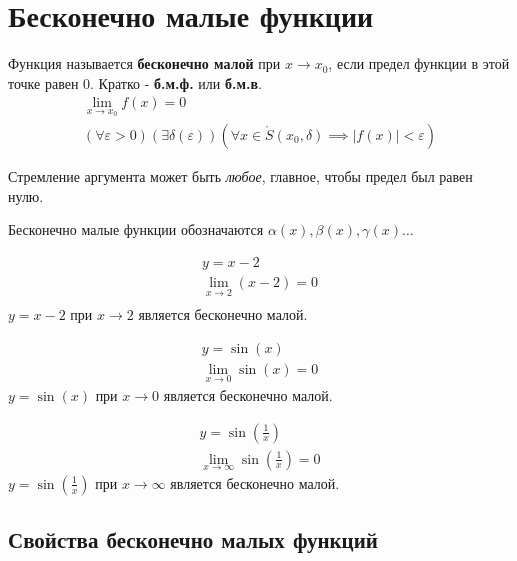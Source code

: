 \section{Бесконечно малые функции}

\begin{definition}
  Функция называется \textbf{бесконечно малой} при $x \to x_0$, если предел функции в этой точке равен $0$. Кратко - \textbf{б.м.ф.} или \textbf{б.м.в}.
  \begin{gather*}
    \lim_{x \to x_0} f(x) = 0 \\
    (\forall \varepsilon > 0)(\exists \delta(\varepsilon)) (\forall x \in \mathring{S}(x_0, \delta) \implies |f(x)| < \varepsilon )
  \end{gather*}
\end{definition}
\begin{note}
  Стремление аргумента может быть \textit{любое}, главное, чтобы предел был равен нулю.
\end{note}

Бесконечно малые функции обозначаются $\alpha(x), \beta(x), \gamma(x)\ldots$

\begin{eg}
  \begin{gather*}
    y = x - 2 \\
    \lim_{x \to 2} (x - 2) = 0 \\ 
  \end{gather*}
  $y = x - 2$ при $x \to 2$ является бесконечно малой.
\end{eg}
\begin{eg}
  \begin{gather*}
    y = \sin(x) \\
    \lim_{x \to 0} \sin(x) = 0
  \end{gather*}
  $y = \sin(x)$ при $x \to 0$ является бесконечно малой.
\end{eg}
\begin{eg}
  \begin{gather*}
    y = \sin(\frac{1}{x}) \\
    \lim_{x \to \infty} \sin(\frac{1}{x}) = 0
  \end{gather*}
  $y = \sin(\frac{1}{x})$ при $x \to \infty$ является бесконечно малой.
\end{eg}

\subsection{Свойства бесконечно малых функций}

